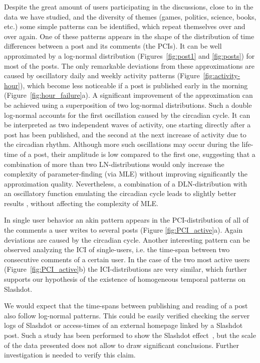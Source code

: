 \documentclass[twoside,11pt]{article}
\begin{document}
Despite the great amount of users participating in the discussions,
close to  in the data we have studied, and the diversity of
themes (games, politics, science, books, etc.) some simple patterns
can be identified, which repeat themselves over and over again. One of
these patterns appears in the shape of the distribution of time
differences between a post and its comments (the PCIs). It can be well
approximated by a log-normal distribution (Figures~\ref{fig:post1} and
\ref{fig:posts}) for most of the posts. The only remarkable deviations
from these approximations are caused by oscillatory daily and weekly
activity patterns (Figure~\ref{fig:activity-hour}), which become less
noticeable if a post is published early in the morning
(Figure~\ref{fig:hour_failure}a). A significant improvement of the
approximation can be achieved using a superposition of two log-normal
distributions. Such a double log-normal accounts for the first
oscillation caused by the circadian cycle.  It can be interpreted as
two independent waves of activity, one starting directly after a post
has been published, and the second at the next increase of activity
due to the circadian rhythm. Although more such oscillations may occur
during the life-time of a post, their amplitude is low compared to the
first one, suggesting that a combination of more than two
LN-distributions would only increase the complexity of
parameter-finding (via MLE) without improving significantly the
approximation quality.  Nevertheless, a combination of a
DLN-distribution with an oscillatory function emulating the circadian
cycle leads to slightly better results \citep{kaltenbrunner_LAWEB2007},
without affecting the complexity of MLE.

In single user behavior an akin pattern appears in the
PCI-distribution of all of the comments a user writes to several posts
(Figure \ref{fig:PCI_active}a). Again deviations are caused by the
circadian cycle.  Another interesting pattern can be observed
analyzing the ICI of single-users, i.e. the time-span between two
consecutive comments of a certain user.  In the case of the two most
active users (Figure~\ref{fig:PCI_active}b) the ICI-distributions are
very similar, which further supports our hypothesis of the existence
of homogeneous temporal patterns on Slashdot.

We would expect that the time-spans between publishing and reading of
a post also follow log-normal patterns. This could be easily verified
checking the server logs of Slashdot or access-times of an external
homepage linked by a Slashdot post.  Such a study has been performed
to show the Slashdot effect~\citep{Adler1999}, but the scale of the
data presented does not allow to draw significant conclusions. Further
investigation is needed to verify this claim.
\end{document}
